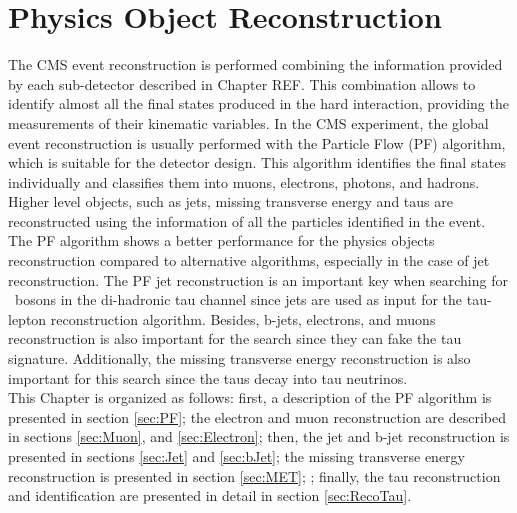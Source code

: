 \chapter[Physics Object Reconstruction]{Physics Object Reconstruction}
\label{chap:ParticleID}

The CMS event reconstruction is performed combining the information 
provided by each sub-detector described in Chapter REF. This 
combination allows to identify almost all the final states produced 
in the hard interaction, providing the measurements 
of their kinematic variables. In the CMS experiment, the global 
event reconstruction is usually performed with the Particle 
Flow (PF) algorithm, which is suitable for the detector
design. This algorithm identifies the final states individually 
and classifies them into muons, electrons, photons, and hadrons. Higher 
level objects, such as jets, missing transverse energy and taus are 
reconstructed using the information of all the particles identified 
in the event. The PF algorithm shows a better performance for the 
physics objects reconstruction compared to alternative 
algorithms, especially in the case of jet reconstruction. The PF jet reconstruction 
is an important key when searching for \Zprime~bosons in the di-hadronic tau 
channel since jets are used as input for the tau-lepton reconstruction 
algorithm. Besides, b-jets, electrons, and muons reconstruction is
also important for the search since they can fake the tau signature. Additionally,
the missing transverse energy reconstruction is also important for 
this search since the taus decay into tau neutrinos.\\

\noindent This Chapter is organized as follows: first, a description of the PF algorithm is 
presented in section \ref{sec:PF}; the electron and muon reconstruction are described in
sections \ref{sec:Muon}, and \ref{sec:Electron}; then, the jet and b-jet 
reconstruction is presented in sections \ref{sec:Jet} and \ref{sec:bJet}; the missing 
transverse energy reconstruction is presented in section  \ref{sec:MET}; ; finally, the tau reconstruction 
and identification are presented in detail in section \ref{sec:RecoTau}.\\




